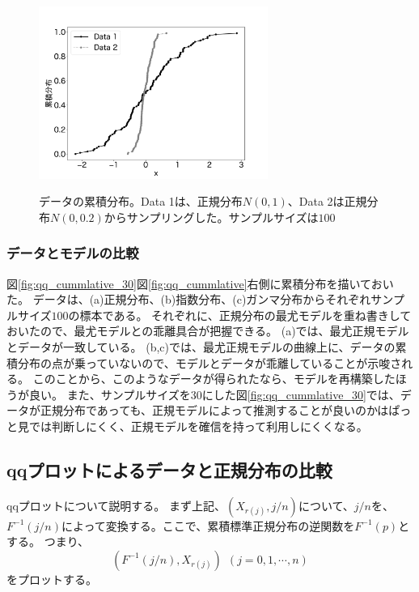\begin{figure}
    \begin{center}
        \includegraphics[width=7.5cm]{./image/12_/cummlative_data_example_norm.pdf}
        \label{fig:qq_ccummlative_data_example_normummlative}
        \caption{データの累積分布。Data 1は、正規分布$N(0,1)$、Data 2は正規分布$N(0,0.2)$からサンプリングした。サンプルサイズは$100$}
    \end{center}
\end{figure}


\subsubsection{データとモデルの比較}
図\ref{fig:qq_cummlative_30}図\ref{fig:qq_cummlative}右側に累積分布を描いておいた。
データは、(a)正規分布、(b)指数分布、(c)ガンマ分布からそれぞれサンプルサイズ$100$の標本である。
それぞれに、正規分布の最尤モデルを重ね書きしておいたので、最尤モデルとの乖離具合が把握できる。
(a)では、最尤正規モデルとデータが一致している。
(b,c)では、最尤正規モデルの曲線上に、データの累積分布の点が乗っていないので、モデルとデータが乖離していることが示唆される。
このことから、このようなデータが得られたなら、モデルを再構築したほうが良い。
また、サンプルサイズを30にした図\ref{fig:qq_cummlative_30}では、データが正規分布であっても、正規モデルによって推測することが良いのかはぱっと見では判断しにくく、正規モデルを確信を持って利用しにくくなる。

\subsection{qqプロットによるデータと正規分布の比較}
qqプロットについて説明する。
まず上記、$(X_{r(j)},j/n)$について、$j/n$を、$F^{-1}(j/n)$によって変換する。ここで、累積標準正規分布の逆関数を$F^{-1}(p)$とする。
つまり、
\begin{equation*}
(F^{-1}(j/n),X_{r(j)}) \ \ (j=0,1,\cdots,n)
\end{equation*}
をプロットする。



